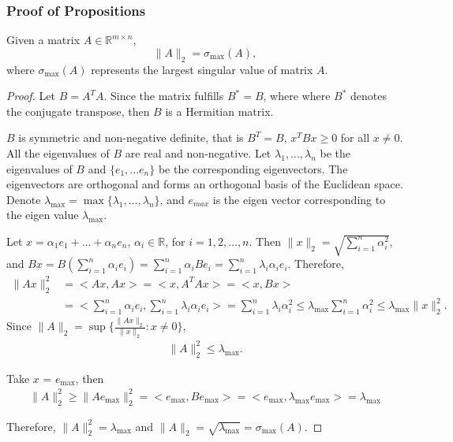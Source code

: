 \subsubsection*{Proof of Propositions}
\begin{proposition}
Given a matrix $A \in \mathbb{R}^{m \times n}$,
\[
\| A \|_2 =   \sigma_{\max} (A),
\]
where $\sigma_{\max} (A)$ represents the largest singular value of matrix $A$.
\end{proposition}

\begin{proof}\cite{doan2013}
Let $B = A^T A$. Since the matrix fulfills $B^* = B$, where where $B^*$ denotes the conjugate transpose, then $B$ is a Hermitian matrix.


$B$ is symmetric and non-negative definite, that is $B^T = B$, $x^T B x \geq 0$ for all $x\neq 0$.
%
All the eigenvalues of $B$ are real and non-negative.
%
Let $\lambda_1, \dots , \lambda_n$ be the eigenvalues of $B$ and $\{e_1,...e_n\}$ be the corresponding eigenvectors.
%
The eigenvectors are orthogonal and forms an orthogonal basis of the Euclidean space.
%
Denote $\lambda_{\max} = \max \{ \lambda_1 , \dots , \lambda_n \}$, and  $e_{max}$ is the eigen vector corresponding to the eigen value $\lambda_{\max}$.

Let $x=\alpha_1 e_1+ \dots + \alpha_n e_n$, $\alpha_i \in \mathbb{R}$, for $i = 1, 2, \dots, n$.
%
Then $\| x \|_2= \sqrt {\sum_{i = 1}^n \alpha_i^2 }$,
%
and $B x = B (\sum_{i = 1}^n \alpha_i e_i) = \sum_{i = 1}^n \alpha_i B e_i  =  \sum_{i = 1}^n \lambda_i \alpha_i  e_i $.
%
Therefore,
\begin{align*}
\| Ax \|_2^2 & =  <Ax,Ax>
 = <x,A^T Ax>
=  <x, Bx>  \\
& =  < \sum_{i = 1}^n \alpha_i e_i ,   \sum_{i = 1}^n \lambda_i \alpha_i  e_i  >
 =  \sum_{i = 1}^n \lambda_i \alpha_i ^2
 \leq     \lambda_{\max}  \sum_{i = 1}^n \alpha_i ^2
 \leq     \lambda_{\max}    \| x \|_2^2 .
\end{align*}
%
Since $\| A \|_2 =\sup \{\frac{\|Ax\|_2}{\|x\|_2}: x \neq 0\}$,
\begin{align*}
\| A \|_2^2 \leq  \lambda_{\max} .
\end{align*}

Take $x$ = $e_{\max}$, then
\begin{align*}
\| A \|_2^2  \geq \| A e_{\max} \|_2^2
= <e_{\max}, B e_{\max}>
= <e_{\max}, \lambda_{\max} e_{\max}>
=  \lambda_{\max}
\end{align*}

Therefore,
$\| A \|_2^2 =  \lambda_{\max}$ and
$\| A \|_2 = \sqrt{ \lambda_{\max} } = \sigma_{\max} (A)$.
\end{proof}


